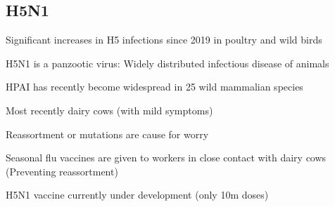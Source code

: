 \documentclass{notes}
\begin{document}
\subsection{H5N1}

Significant increases in H5 infections since 2019 in poultry and wild birds

\tab H5N1 is a panzootic virus: Widely distributed infectious disease of animals

HPAI has recently become widespread in 25 wild mammalian species

\tab Most recently dairy cows (with mild symptoms)

\tab Reassortment or mutations are cause for worry

\tab \indicates Seasonal flu vaccines are given to workers in close contact with dairy cows (Preventing reassortment)

\tab \indicates H5N1 vaccine currently under development (only 10m doses)
\end{document}
